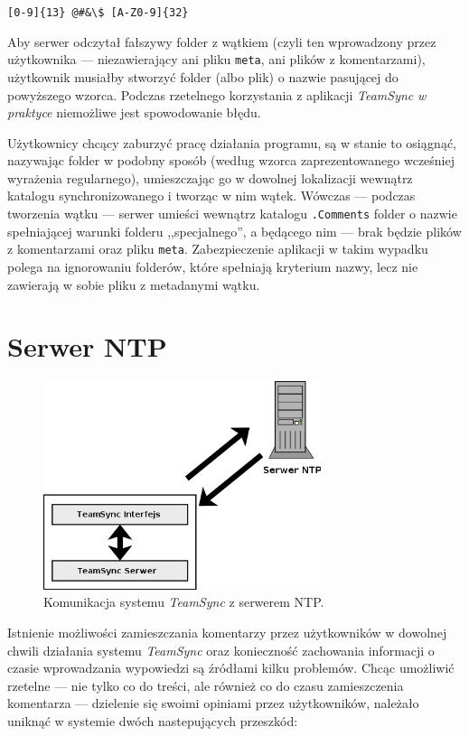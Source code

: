 \documentclass[polish,a4paper,twoside]{ppfcmthesis}
\begin{document}
\begin{center}
  \texttt{[0-9]\{13\} @\#\&\textbackslash\$ [A-Z0-9]\{32\}}
\end{center}

Aby serwer odczytał fałszywy folder z wątkiem (czyli ten wprowadzony przez użytkownika --- niezawierający ani pliku \texttt{meta}, ani plików z komentarzami), użytkownik musiałby stworzyć folder (albo plik) o nazwie pasującej do powyższego wzorca. Podczas rzetelnego korzystania z aplikacji \emph{TeamSync} \emph{w praktyce} niemożliwe jest spowodowanie błędu.

Użytkownicy chcący zaburzyć pracę działania programu, są w stanie to osiągnąć, nazywając folder w podobny sposób (według wzorca zaprezentowanego wcześniej wyrażenia regularnego), umieszczając go w dowolnej lokalizacji wewnątrz katalogu synchronizowanego i tworząc w nim wątek. Wówczas --- podczas tworzenia wątku --- serwer umieści wewnątrz katalogu \texttt{.Comments} folder o nazwie spełniającej warunki folderu ,,specjalnego'', a będącego nim --- brak będzie plików z komentarzami oraz pliku \texttt{meta}. Zabezpieczenie aplikacji w takim wypadku polega na ignorowaniu folderów, które spełniają kryterium nazwy, lecz nie zawierają w sobie pliku z metadanymi wątku.

\section{Serwer NTP}

\begin{figure}[htb]
  \vspace{5pt}
  \begin{center}
    \includegraphics[width=230pt]{figures/architecturentp.png}
  \end{center}
  \caption{Komunikacja systemu \emph{TeamSync} z serwerem NTP.}
\end{figure}

Istnienie możliwości zamieszczania komentarzy przez użytkowników w dowolnej chwili działania systemu \emph{TeamSync} oraz konieczność zachowania informacji o czasie wprowadzania wypowiedzi są źródłami kilku problemów. Chcąc umożliwić rzetelne --- nie tylko co do treści, ale również co do czasu zamieszczenia komentarza --- dzielenie się swoimi opiniami przez użytkowników, należało uniknąć w systemie dwóch nastepujących przeszkód:
\end{document}
